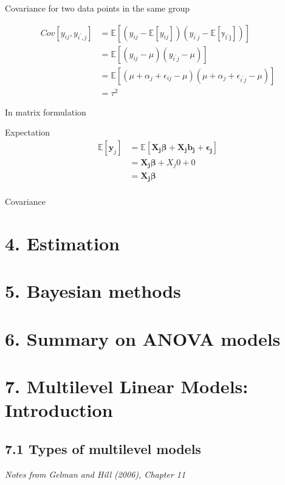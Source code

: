 \documentclass[12pt,]{article}
\begin{document}
Covariance for two data points in the same group

\[
\begin{aligned}
Cov[y_{ij}, y_{i^\prime, j}] &= \mathbb{E}[(y_{ij} - \mathbb{E}[y_{ij}])(y_{i^\prime j } - \mathbb{E[y_{i^\prime j}]})]\\
&= \mathbb{E}[(y_{ij} - \mu)(y_{i^\prime j} - \mu)]\\
&= \mathbb{E}[(\mu + \alpha_j + \epsilon_{ij} - \mu)(\mu + \alpha_j + \epsilon_{i^\prime j} - \mu)]\\
&= \tau^2
\end{aligned}
\]

In matrix formulation

Expectation \[
\begin{aligned}
\mathbb{E}[\mathbf{y}_j] &= \mathbb{E}[\mathbf{X_j \beta + X_jb_j + \epsilon_j}]\\
&= \mathbf{X_j \beta} + X_j0 + 0\\
&= \mathbf{X_j \beta}\\
\end{aligned}
\]

Covariance

\section{4. Estimation}\label{estimation}

\section{5. Bayesian methods}\label{bayesian-methods}

\section{6. Summary on ANOVA models}\label{summary-on-anova-models}

\section{7. Multilevel Linear Models:
Introduction}\label{multilevel-linear-models-introduction}

\subsection{7.1 Types of multilevel
models}\label{types-of-multilevel-models}

\emph{Notes from Gelman and Hill (2006), Chapter 11}
\end{document}
